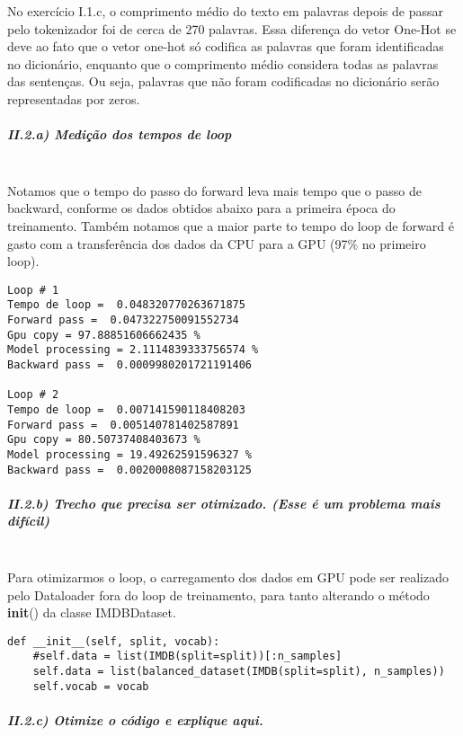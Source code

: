 \documentclass[11pt]{article}
\begin{document}
No exercício I.1.c, o comprimento médio do texto em palavras depois de
passar pelo tokenizador foi de cerca de 270 palavras. Essa diferença do
vetor One-Hot se deve ao fato que o vetor one-hot só codifica as
palavras que foram identificadas no dicionário, enquanto que o
comprimento médio considera todas as palavras das sentenças. Ou seja,
palavras que não foram codificadas no dicionário serão representadas por
zeros.

    \subparagraph{II.2.a) Medição dos tempos de
loop}\label{ii.2.a-mediuxe7uxe3o-dos-tempos-de-loop}\mbox{} \\

Notamos que o tempo do passo do forward leva mais tempo que o passo de
backward, conforme os dados obtidos abaixo para a primeira época do
treinamento. Também notamos que a maior parte to tempo do loop de
forward é gasto com a transferência dos dados da CPU para a GPU (97\% no
primeiro loop).

\begin{verbatim}
Loop # 1
Tempo de loop =  0.048320770263671875
Forward pass =  0.047322750091552734
Gpu copy = 97.88851606662435 %
Model processing = 2.1114839333756574 %
Backward pass =  0.0009980201721191406

Loop # 2
Tempo de loop =  0.007141590118408203
Forward pass =  0.005140781402587891
Gpu copy = 80.50737408403673 %
Model processing = 19.49262591596327 %
Backward pass =  0.0020008087158203125
\end{verbatim}

\subparagraph{II.2.b) Trecho que precisa ser otimizado. (Esse é um
problema mais
difícil)}\label{ii.2.b-trecho-que-precisa-ser-otimizado.-esse-uxe9-um-problema-mais-difuxedcil}\mbox{} \\

Para otimizarmos o loop, o carregamento dos dados em GPU pode ser
realizado pelo Dataloader fora do loop de treinamento, para tanto
alterando o método \textbf{init}() da classe IMDBDataset.

\begin{verbatim}
def __init__(self, split, vocab):
    #self.data = list(IMDB(split=split))[:n_samples]
    self.data = list(balanced_dataset(IMDB(split=split), n_samples))        
    self.vocab = vocab
\end{verbatim}

\subparagraph{II.2.c) Otimize o código e explique
aqui.}\label{ii.2.c-otimize-o-cuxf3digo-e-explique-aqui.}\mbox{} \\
\end{document}
